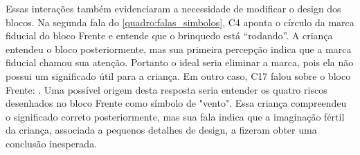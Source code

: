 Essas interações também evidenciaram a necessidade de modificar o design dos blocos. Na segunda fala do \autoref{quadro:falas_simbolos}, C4 aponta o círculo da marca fiducial do bloco Frente e entende que o brinquedo está “rodando”. A criança entendeu o bloco posteriormente, mas sua primeira percepção indica que a marca fiducial chamou sua atenção. Portanto o ideal seria eliminar a marca, pois ela não possui um significado útil para a criança. Em outro caso, C17 falou sobre o bloco Frente: . Uma possível origem desta resposta seria entender os quatro riscos desenhados no bloco Frente como símbolo de "vento". Essa criança compreendeu o significado correto posteriormente, mas sua fala indica que a imaginação fértil da criança, associada a pequenos detalhes de design, a fizeram obter uma conclusão inesperada.

